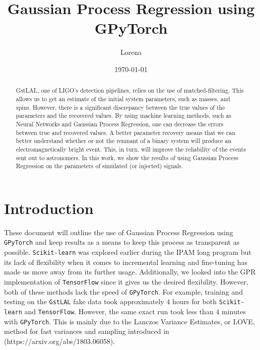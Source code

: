 \documentclass[aps,prd,twocolumn,superscriptaddress,preprintnumbers,floatfix,nofootinbib]{revtex4-2}
\begin{document}
\title{Gaussian Process Regression using GPyTorch}

\author{Lorena }

\date{\today}

\begin{abstract}
	GstLAL, one of LIGO's detection pipelines, relies on the use of matched-filtering.
	This allows us to get an estimate of the initial system parameters, such as masses, 
	and spins. However, there is a significant discrepancy between the true values of 
	the parameters and the recovered values. By using machine learning methods, 
	such as Neural Networks and Gaussian Process Regression, one can decrease the 
	errors between true and recovered values. A better parameter recovery means 
	that we can better understand whether or not the remnant of a binary system will 
	produce an electromagnetically bright event. This, in turn, will improve the reliability 
	of the events sent out to astronomers. In this work, we show the results of using
	Gaussian Process Regression on the parameters of simulated (or injected) signals. 
\end{abstract}

\maketitle

\section{Introduction}
These document will outline the use of Gaussian Process Regression using \texttt{GPyTorch} 
and keep results as a means to keep this process as transparent as possible. 
\texttt{Scikit-learn} was explored earlier during the IPAM long program but its lack of flexibility 
when it comes to incremental learning and fine-tuning has made us move away from its further 
usage. Additionally, we looked into the GPR implementation of \texttt{TensorFlow} since it gives 
us the desired flexibility. However, both of these methods lack the speed of \texttt{GPyTorch}. 
For example, training and testing on the \texttt{GstLAL} fake data took approximately $4$ hours for 
both \texttt{Scikit-learn} and \texttt{TensorFlow}. However, the same exact run took less than 
$4$ minutes with \texttt{GPyTorch}. This is mainly due to the Lanczos Variance Estimates, or 
LOVE, method for fast variances and sampling introduced in (https://arxiv.org/abs/1803.06058).
\end{document}
